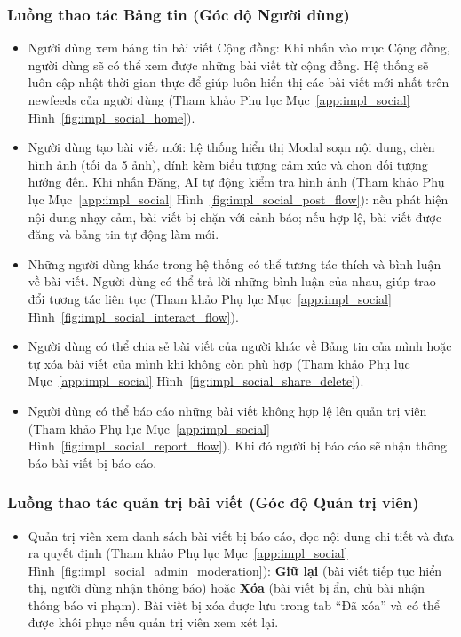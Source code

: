 \subsubsection{Luồng thao tác Bảng tin (Góc độ Người dùng)}
\begin{itemize}
    \item Người dùng xem bảng tin bài viết Cộng đồng: Khi nhấn vào mục Cộng đồng, người dùng sẽ có thể xem được những bài viết từ cộng đồng. Hệ thống sẽ luôn cập nhật thời gian thực để giúp luôn hiển thị các bài viết mới nhất trên newfeeds của người dùng (Tham khảo Phụ lục Mục~\ref{app:impl_social} Hình~\ref{fig:impl_social_home}).


    \item Người dùng tạo bài viết mới: hệ thống hiển thị Modal soạn nội dung, chèn hình ảnh (tối đa 5 ảnh), đính kèm biểu tượng cảm xúc và chọn đối tượng hướng đến. Khi nhấn Đăng, AI tự động kiểm tra hình ảnh (Tham khảo Phụ lục Mục~\ref{app:impl_social} Hình~\ref{fig:impl_social_post_flow}): nếu phát hiện nội dung nhạy cảm, bài viết bị chặn với cảnh báo; nếu hợp lệ, bài viết được đăng và bảng tin tự động làm mới.

    \item Những người dùng khác trong hệ thống có thể tương tác thích và bình luận về bài viết. Người dùng có thể trả lời những bình luận của nhau, giúp trao đổi tương tác liên tục (Tham khảo Phụ lục Mục~\ref{app:impl_social} Hình~\ref{fig:impl_social_interact_flow}).


    \item Người dùng có thể chia sẻ bài viết của người khác về Bảng tin của mình hoặc tự xóa bài viết của mình khi không còn phù hợp (Tham khảo Phụ lục Mục~\ref{app:impl_social} Hình~\ref{fig:impl_social_share_delete}).


    \item Người dùng có thể báo cáo những bài viết không hợp lệ lên quản trị viên (Tham khảo Phụ lục Mục~\ref{app:impl_social} Hình~\ref{fig:impl_social_report_flow}). Khi đó người bị báo cáo sẽ nhận thông báo bài viết bị báo cáo.

\end{itemize}

\subsubsection{Luồng thao tác quản trị bài viết (Góc độ Quản trị viên)}
\begin{itemize}
    \item Quản trị viên xem danh sách bài viết bị báo cáo, đọc nội dung chi tiết và đưa ra quyết định (Tham khảo Phụ lục Mục~\ref{app:impl_social} Hình~\ref{fig:impl_social_admin_moderation}): \textbf{Giữ lại} (bài viết tiếp tục hiển thị, người dùng nhận thông báo) hoặc \textbf{Xóa} (bài viết bị ẩn, chủ bài nhận thông báo vi phạm). Bài viết bị xóa được lưu trong tab ``Đã xóa'' và có thể được khôi phục nếu quản trị viên xem xét lại.

\end{itemize}

